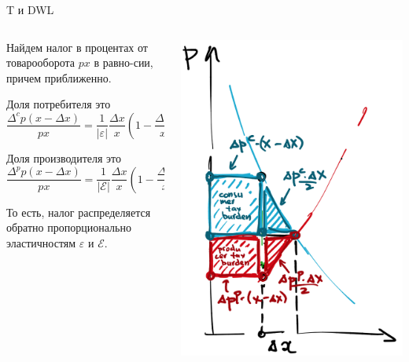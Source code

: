 \documentclass{beamer}
\begin{document}
\begin{frame}{T и DWL}
\begin{columns}
\begin{column}{0.5\textwidth}
   Найдем налог в процентах от товарооборота $p x$ в равно-сии, причем \alert{приближенно}.
   
   \medskip
   Доля потребителя это $$\frac{\Delta^c p (x - \Delta x)}{px} = \frac{1}{|\varepsilon|}\frac{\Delta x}{x} (1 - \frac{\Delta x}{x})$$
    
   \medskip
   Доля производителя это $$\frac{\Delta^p p (x - \Delta x)}{px} = \frac{1}{|\mathcal{E}|}\frac{\Delta x}{x} (1 - \frac{\Delta x}{x})$$
   
   \medskip
   То есть, \alert{налог распределяется обратно пропорционально эластичностям} $\varepsilon$ и $\mathcal{E}$.
\end{column}
\begin{column}{0.5\textwidth}  %
    \begin{center}
     \includegraphics[width=1\textwidth]{taxburden}
     \end{center}
\end{column}
\end{columns}
\end{frame}
\end{document}
